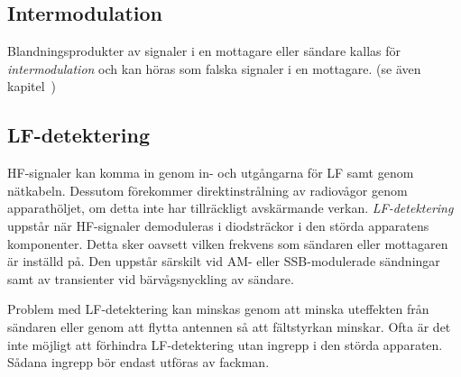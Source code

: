 \subsection{Intermodulation}

Blandningsprodukter av signaler i en mottagare eller sändare kallas för
\emph{intermodulation} och kan höras som falska signaler i en mottagare.
(se även kapitel~)

\subsection{LF-detektering}

HF-signaler kan komma in genom in- och utgångarna för LF samt genom nätkabeln.
Dessutom förekommer direktinstrålning av radiovågor genom apparathöljet, om
detta inte har tillräckligt avskärmande verkan.
\emph{LF-detektering} uppstår när HF-signaler demoduleras i diodsträckor i den
störda apparatens komponenter.
Detta sker oavsett vilken frekvens som sändaren eller mottagaren är inställd på.
Den uppstår särskilt vid AM- eller SSB-modulerade sändningar
samt av transienter vid bärvågsnyckling av sändare.

Problem med LF-detektering kan minskas genom att minska uteffekten från sändaren
eller genom att flytta antennen så att fältstyrkan minskar.
Ofta är det inte möjligt att förhindra LF-detektering utan ingrepp i den störda
apparaten.
Sådana ingrepp bör endast utföras av fackman.
